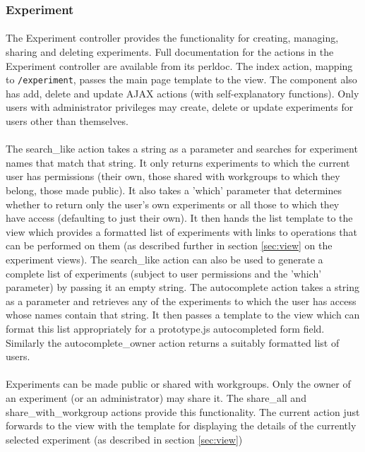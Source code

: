 \subsubsection{Experiment}
\label{sec:controller_experiment}

\paragraph{}
The Experiment controller provides the functionality for creating, managing, sharing and deleting experiments. Full documentation for the actions in the Experiment controller are available from its perldoc. The index action, mapping to \texttt{/experiment}, passes the main page template to the view. The component also has add, delete and update AJAX actions (with self-explanatory functions). Only users with administrator privileges may create, delete or update experiments for users other than themselves. 

\paragraph{}
The search\_like action takes a string as a parameter and searches for experiment names that match that string. It only returns experiments to which the current user has permissions (their own, those shared with workgroups to which they belong, those made public). It also takes a 'which' parameter that determines whether to return only the user's own experiments or all those to which they have access (defaulting to just their own). It then hands the list template to the view which provides a formatted list of experiments with links to operations that can be performed on them (as described further in section \ref{sec:view} on the experiment views). The search\_like action can also be used to generate a complete list of experiments (subject to user permissions and the 'which' parameter) by passing it an empty string. The autocomplete action takes a string as a parameter and retrieves any of the experiments to which the user has access whose names contain that string. It then passes a template to the view which can format this list appropriately for a prototype.js autocompleted form field. Similarly the autocomplete\_owner action returns a suitably formatted list of users. 

\paragraph{}
Experiments can be made public or shared with workgroups. Only the owner of an experiment (or an administrator) may share it. The share\_all and share\_with\_workgroup actions provide this functionality. 
The current action just forwards to the view with the template for displaying the details of the currently selected experiment (as described in section \ref{sec:view}) 


